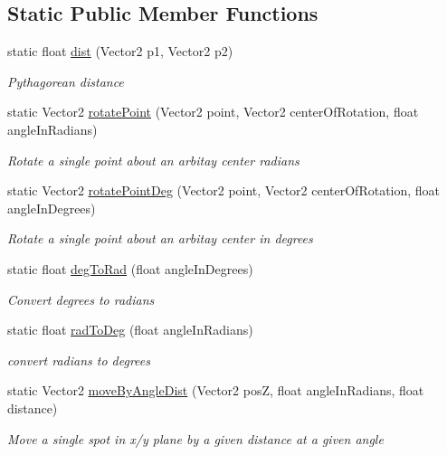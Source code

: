 \subsection*{Static Public Member Functions}
\begin{DoxyCompactItemize}
\item 
static float \mbox{\hyperlink{class_r_c___framework_1_1_util_ab64b89f35cd444e0de8ff911c7eb97ae}{dist}} (Vector2 p1, Vector2 p2)
\begin{DoxyCompactList}\small\item\em Pythagorean distance \end{DoxyCompactList}\item 
static Vector2 \mbox{\hyperlink{class_r_c___framework_1_1_util_a5d6c5f7ec7c507c48a6f42fae4cdfb23}{rotate\+Point}} (Vector2 point, Vector2 center\+Of\+Rotation, float angle\+In\+Radians)
\begin{DoxyCompactList}\small\item\em Rotate a single point about an arbitay center radians \end{DoxyCompactList}\item 
static Vector2 \mbox{\hyperlink{class_r_c___framework_1_1_util_a8a768b99dd53f6fc5906dbc5da8a69fa}{rotate\+Point\+Deg}} (Vector2 point, Vector2 center\+Of\+Rotation, float angle\+In\+Degrees)
\begin{DoxyCompactList}\small\item\em Rotate a single point about an arbitay center in degrees \end{DoxyCompactList}\item 
static float \mbox{\hyperlink{class_r_c___framework_1_1_util_a086caff1ffcf1feb50c4839cf1e698c8}{deg\+To\+Rad}} (float angle\+In\+Degrees)
\begin{DoxyCompactList}\small\item\em Convert degrees to radians \end{DoxyCompactList}\item 
static float \mbox{\hyperlink{class_r_c___framework_1_1_util_a4f7b82a75ed62f22465f81917f0683ce}{rad\+To\+Deg}} (float angle\+In\+Radians)
\begin{DoxyCompactList}\small\item\em convert radians to degrees \end{DoxyCompactList}\item 
static Vector2 \mbox{\hyperlink{class_r_c___framework_1_1_util_a38093fb4ea209c5f44f2a6d3f08a1202}{move\+By\+Angle\+Dist}} (Vector2 posZ, float angle\+In\+Radians, float distance)
\begin{DoxyCompactList}\small\item\em Move a single spot in x/y plane by a given distance at a given angle \end{DoxyCompactList}\item 

\end{DoxyCompactItemize}
